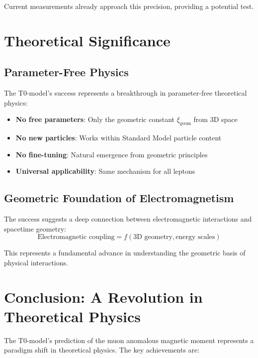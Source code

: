 \documentclass[12pt,a4paper]{report}
\newcommand{\xigeom}{\xi_{\text{geom}}}   %
\begin{document}
	Current measurements already approach this precision, providing a potential test.
	
	\section{Theoretical Significance}
	\label{sec:theoretical_significance}
	
	\subsection{Parameter-Free Physics}
	\label{subsec:parameter_free_physics}
	
	The T0-model's success represents a breakthrough in parameter-free theoretical physics:
	\begin{itemize}
		\item \textbf{No free parameters}: Only the geometric constant $\xigeom$ from 3D space
		\item \textbf{No new particles}: Works within Standard Model particle content
		\item \textbf{No fine-tuning}: Natural emergence from geometric principles
		\item \textbf{Universal applicability}: Same mechanism for all leptons
	\end{itemize}
	
	\subsection{Geometric Foundation of Electromagnetism}
	\label{subsec:geometric_electromagnetism}
	
	The success suggests a deep connection between electromagnetic interactions and spacetime geometry:
	\begin{equation}
		\text{Electromagnetic coupling} = f(\text{3D geometry}, \text{energy scales})
		\label{eq:electromagnetic_geometry}
	\end{equation}
	
	This represents a fundamental advance in understanding the geometric basis of physical interactions.
	
	\section{Conclusion: A Revolution in Theoretical Physics}
	\label{sec:conclusion}
	
	The T0-model's prediction of the muon anomalous magnetic moment represents a paradigm shift in theoretical physics. The key achievements are:
	
\end{document}

